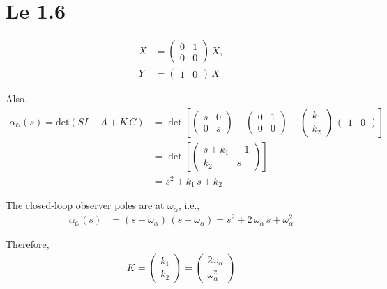 \section{Le 1.6}

\begin{align*}
    X &= \begin{pmatrix}
        0 & 1 \\ 0 & 0
    \end{pmatrix}\,X, \\
    Y &= \begin{pmatrix}
        1 & 0 
    \end{pmatrix}\,X
\end{align*}

Also, 
\begin{align*}
    \alpha_\mathcal{O}(s) = \text{det}\left(SI - A + K\,C\right) &= \det\left[\begin{pmatrix}
        s & 0 \\ 0 & s
    \end{pmatrix} - \begin{pmatrix}
        0 & 1 \\ 0 & 0
    \end{pmatrix} + \begin{pmatrix}
        k_1 \\ k_2
    \end{pmatrix}\,\begin{pmatrix}
        1 & 0
    \end{pmatrix}\right] \\
    &= \det\left[\begin{pmatrix}
        s + k_1 & -1 \\ k_2 & s
    \end{pmatrix}\right] \\
    &= s^2 + k_1\,s + k_2
\end{align*}

The closed-loop observer poles are at $\omega_\alpha$, i.e., 
\begin{align*}
    \alpha_\mathcal{O}(s) &= \left(s + \omega_\alpha\right)\,\left(s + \omega_\alpha\right) = s^2 + 2\,\omega_\alpha\,s + \omega_\alpha^2
\end{align*}

Therefore,
\begin{align*}
    K = \begin{pmatrix}
        k_1 \\ k_2
    \end{pmatrix} = \begin{pmatrix}
        2\omega_\alpha \\ \omega_\alpha^2
    \end{pmatrix}
\end{align*}

